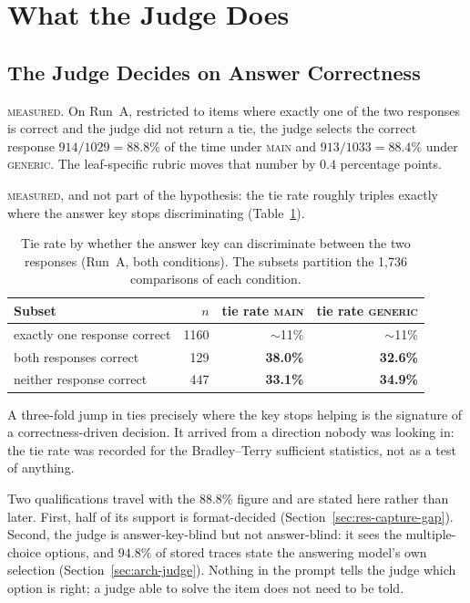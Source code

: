 \section{What the Judge Does}\label{sec:res-judge}

\subsection{The Judge Decides on Answer Correctness}\label{sec:res-correctness}

\textsc{measured.} On Run~A, restricted to items where exactly one of
the two responses is correct and the judge did not return a tie, the
judge selects the correct response $914/1029 = 88.8\%$ of the time
under \textsc{main} and $913/1033 = 88.4\%$ under
\textsc{generic}. The leaf-specific rubric moves that number by
$0.4$ percentage points.

\textsc{measured}, and not part of the hypothesis: the tie rate roughly
triples exactly where the answer key stops discriminating
(Table~\ref{tab:tie-by-key}).

\begin{table}[htbp]
\centering
\caption{Tie rate by whether the answer key can discriminate between
the two responses (Run~A, both conditions). The subsets partition the
1{,}736 comparisons of each condition.}
\label{tab:tie-by-key}
\begin{tabular}{lrrr}
\toprule
Subset & $n$ & tie rate \textsc{main} & tie rate \textsc{generic} \\
\midrule
exactly one response correct & 1160 & $\sim$11\% & $\sim$11\% \\
both responses correct       & 129  & \textbf{38.0\%} & \textbf{32.6\%} \\
neither response correct     & 447  & \textbf{33.1\%} & \textbf{34.9\%} \\
\bottomrule
\end{tabular}
\end{table}

A three-fold jump in ties precisely where the key stops helping is the
signature of a correctness-driven decision. It arrived from a direction
nobody was looking in: the tie rate was recorded for the
Bradley--Terry sufficient statistics, not as a test of anything.

Two qualifications travel with the $88.8\%$ figure and are stated here
rather than later. First, half of its support is format-decided
(Section~\ref{sec:res-capture-gap}). Second, the judge is
answer-key-blind but not answer-blind: it sees the multiple-choice
options, and $94.8\%$ of stored traces state the answering model's own
selection (Section~\ref{sec:arch-judge}). Nothing in the prompt tells
the judge which option is right; a judge able to solve the item does
not need to be told.

